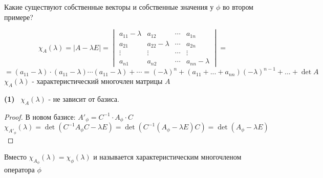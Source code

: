     \begin{exercise}
        Какие существуют собственные векторы и собственные значения у $\phi$ во втором примере?
    \end{exercise}
    \begin{definition}
        $$\chi_A(\lambda) = |A - \lambda E| = 
        \begin{vmatrix}
            a_{11} - \lambda & a_{12} & \cdots & a_{1n}\\
            a_{21} & a_{22} - \lambda & \cdots & a_{2n}\\
            \vdots & \vdots & \cdots & \vdots \\
            a_{n1} & a_{n2} & \cdots & a_{nn}-\lambda
        \end{vmatrix}= $$ 
         $$=(a_{11}-\lambda)\cdot(a_{11}-\lambda)\cdots(a_{11}-\lambda)+\cdots = (-\lambda)^n+(a_{11}+ ... + a_{nn})(-\lambda)^{n-1}+...+\det A$$
         $\chi_A(\lambda)$ - характеристический многочлен матрицы $A$
    \end{definition}
    \begin{subtheorem}\textbf{(1)} \ 
        $\chi_A(\lambda)$ - не зависит от базиса. 
    \end{subtheorem}
    \begin{proof}
        В новом базисе: $A'_\phi = C^{-1}\cdot A_\phi\cdot C$
        $$\chi_{A'_\phi}(\lambda) = \det (C^{-1} A_\phi C - \lambda E) = \det (C^{-1} (A_\phi - \lambda E)  C) = \det (A_\phi - \lambda E)$$ 
    \end{proof}
    \begin{definition}
        Вместо $\chi_{A_\phi}(\lambda) = \chi_\phi(\lambda)$ и называется характеристическим многочленом оператора $\phi$
    \end{definition}  